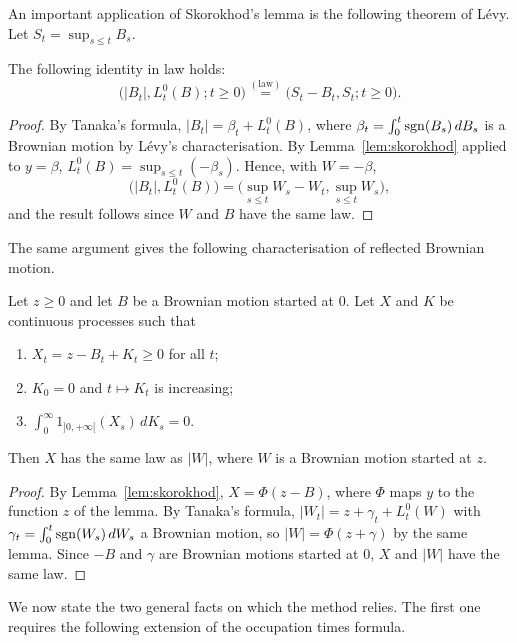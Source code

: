 An important application of Skorokhod's lemma is the following theorem of
Lévy. Let $S_t = \sup_{s\leqslant t} B_s$.

\begin{theorem}\label{lev}
	The following identity in law holds:
	\[
		\big(|B_t|,L_t^0(B) ; t\geqslant 0\big)\overset{(\text{law})}{=}\big(S_t - B_t , S_t; t\geqslant 0\big).
	\]
\end{theorem}

\begin{proof}
	By Tanaka's formula, $|B_t| = \beta_t + L^0_t(B)$, where
	$\beta_t = \int_0^t \operatorname{sgn}(B_s)\,dB_s$ is a Brownian motion by Lévy's
	characterisation. By Lemma~\ref{lem:skorokhod} applied to $y = \beta$,
	$L^0_t(B) = \sup_{s\leqslant t}(-\beta_s)$. Hence, with $W = -\beta$,
	\[
		\big(|B_t|, L^0_t(B)\big) = \Big(\sup_{s\leqslant t} W_s - W_t, \sup_{s\leqslant t} W_s\Big),
	\]
	and the result follows since $W$ and $B$ have the same law.
\end{proof}

The same argument gives the following characterisation of reflected Brownian
motion.

\begin{proposition}\label{pro21}
	Let $z\geqslant 0$ and let $B$ be a Brownian motion started at $0$. Let $X$
	and $K$ be continuous processes such that
	\begin{enumerate}[label=(\roman*)]
		\item $X_t=z-B_t + K_t \geqslant 0$ for all $t$;
		\item $K_0 = 0$ and $t\mapsto K_t$ is increasing;
		\item $\int_0^\infty 1_{]0,+\infty [}(X_s)\, dK_s = 0$.
	\end{enumerate}
	Then $X$ has the same law as $|W|$, where $W$ is a Brownian motion started at $z$.
\end{proposition}

\begin{proof}
	By Lemma~\ref{lem:skorokhod}, $X = \Phi(z - B)$, where $\Phi$ maps $y$ to the
	function $z$ of the lemma. By Tanaka's formula,
	$|W_t| = z + \gamma_t + L^0_t(W)$ with $\gamma_t = \int_0^t \operatorname{sgn}(W_s)\,dW_s$ a
	Brownian motion, so $|W| = \Phi(z + \gamma)$ by the same lemma. Since $-B$ and
	$\gamma$ are Brownian motions started at $0$, $X$ and $|W|$ have the same law.
\end{proof}

We now state the two general facts on which the method relies. The first one
requires the following extension of the occupation times formula.

